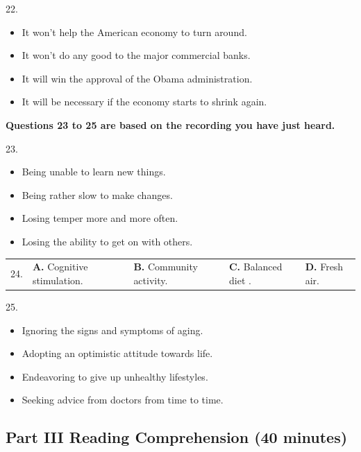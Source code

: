 \documentclass[UTF8,11pt]{ctexart}
\begin{document}
22.


\begin{itemize}[leftmargin=2em,itemsep=.2em,topsep=.4em]\item[A.] It won’t help the American economy to turn around.
\item[B.] It won’t do any good to the major commercial banks.
\item[C.] It will win the approval of the Obama administration.
\item[D.] It will be necessary if the economy starts to shrink again.
\end{itemize}

\textbf{Questions 23 to 25 are based on the recording you have just heard.}


23.


\begin{itemize}[leftmargin=2em,itemsep=.2em,topsep=.4em]\item[A.] Being unable to learn new things.
\item[B.] Being rather slow to make changes.
\item[C.] Losing temper more and more often.
\item[D.] Losing the ability to get on with others.
\end{itemize}

\noindent\begin{tabularx}{\linewidth}{@{}lXXXX@{}}24. & \textbf{A.} Cognitive stimulation. & \textbf{B.} Community activity. & \textbf{C.} Balanced diet . & \textbf{D.} Fresh air.\\\end{tabularx}\par

25.


\begin{itemize}[leftmargin=2em,itemsep=.2em,topsep=.4em]\item[A.] Ignoring the signs and symptoms of aging.
\item[B.] Adopting an optimistic attitude towards life.
\item[C.] Endeavoring to give up unhealthy lifestyles.
\item[D.] Seeking advice from doctors from time to time.
\end{itemize}

\subsection*{\textbf{Part III Reading Comprehension (40 minutes)}}
\end{document}

